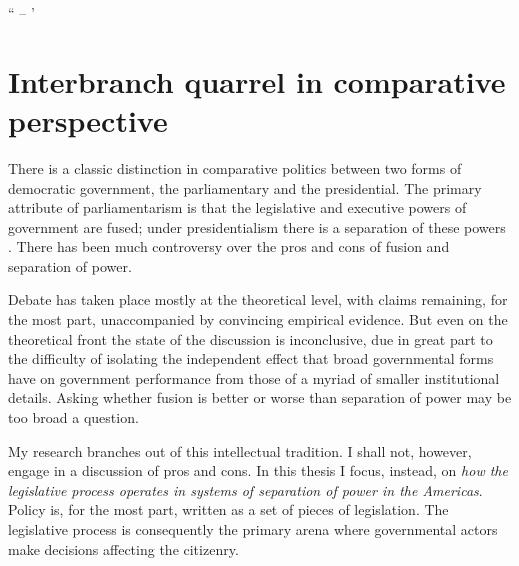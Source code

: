“
–
’
 
\chapter{Interbranch quarrel in comparative perspective}
\label{ch:sopInPerspective}


There is a classic distinction in comparative politics between two forms of democratic government, the parliamentary and the presidential.  The primary attribute of parliamentarism is that the legislative and executive powers of government are fused; under presidentialism there is a separation of these powers \citep{lijphart.1984}. There has been much controversy over the pros and cons of fusion and separation of power.  

Debate has taken place mostly at the theoretical level, with claims remaining, for the most part, unaccompanied by convincing empirical evidence.  But even on the theoretical front the state of the discussion is inconclusive, due in great part to the difficulty of isolating the independent effect that broad governmental forms have on government performance from those of a myriad of smaller institutional details.  Asking whether fusion is better or worse than separation of power may be too broad a question.  

My research branches out of this intellectual tradition.  I shall not, however, engage in a discussion of pros and cons.  In this thesis I focus, instead, on \emph{how the legislative process operates in systems of separation of power in the Americas}.  Policy is, for the most part, written as a set of pieces of legislation.  The legislative process is consequently the primary arena where governmental actors make decisions affecting the citizenry.  

